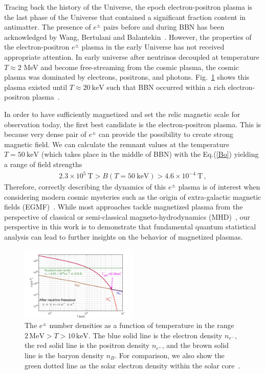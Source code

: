 \documentclass[twocolumn,preprintnumbers,amsmath,amssymb]{revtex4-2}
\begin{document}
Tracing back the history of the Universe, the epoch electron-positron plasma is the last phase of the Universe that contained a significant fraction content in antimatter. The presence of $e^{\pm}$ pairs before and during BBN has been acknowledged by Wang, Bertulani and Balantekin~\cite{Wang:2010px,Hwang:2021kno}. However, the properties of the electron-positron $e^{\pm}$ plasma in the early Universe has not received appropriate attention. In early universe after neutrinos decoupled  at temperature $T\approx2$ MeV and become free-streaming from the cosmic plasma, the cosmic plasma was dominated by electrons, positrons, and photons. Fig.~\ref{Density_fig} shows this plasma existed until $T\approx20\ \mathrm{keV}$ such that BBN occurred within a rich electron-positron plasma~\cite{Chris:2023abc}. 

In order to have sufficiently magnetized and set the relic magnetic scale for observation today, the first best candidate is the electron-positron plasma. This is because very dense pair of $e^\pm$ can provide the possibility to create strong magnetic field. We can calculate the remnant values at the temperature $T=50\ \mathrm{keV}$ (which takes place in the middle of BBN) with the Eq.(\ref{Bo}) yielding a range of field strengths
\begin{align}
 \label{BBNRange} 2.3\times10^{5}\ \mathrm{T}>B(T=50\ \mathrm{keV})>4.6\times10^{-4}\ \mathrm{T}\,,
\end{align}
Therefore, correctly describing the dynamics of this $e^{\pm}$ plasma is of interest when considering modern cosmic mysteries such as the origin of extra-galactic magnetic fields (EGMF)~\cite{Anchordoqui:2001bs,Neronov:2010gir}. While most approaches tackle magnetized plasma from the perspective of classical or semi-classical magneto-hydrodynamics (MHD)~\cite{berezhiani1992influence,berezhiani1995large,Schlickeiser:2018hzq}, our perspective in this work is to demonstrate that fundamental quantum statistical analysis can lead to further insights on the behavior of magnetized plasmas.


\begin{figure}[h]
\centerline{\includegraphics[width=0.5\textwidth]{./plots/NewDensity_cm3_new.jpg}}
\caption{The $e^{\pm}$ number densities as a function of temperature in the range $2\,\mathrm{MeV}>T>10\,\mathrm{keV}$. The blue solid line is the electron density $n_{e^{-}}$, the red solid line is the positron density $n_{e^{+}}$, and the brown solid line is the baryon density $n_{B}$. For comparison, we also show the green dotted line as the solar electron density within the solar core~\cite{Bahcall:2000nu}.}
\label{Density_fig} 
\end{figure}
\end{document}
